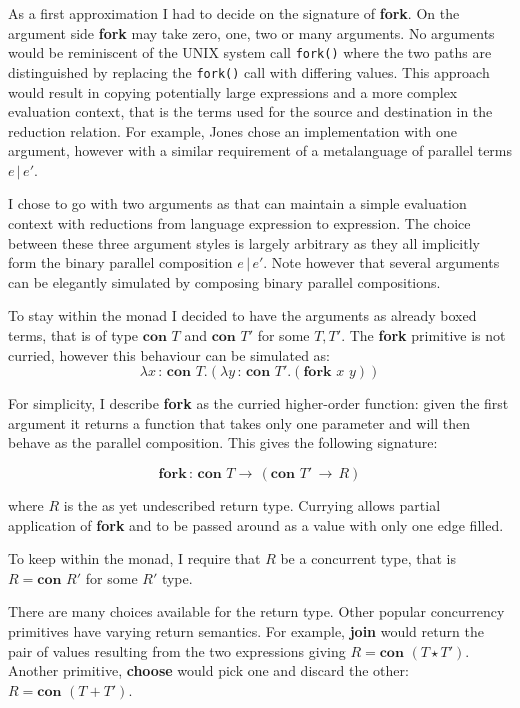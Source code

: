 \documentclass[12pt,twoside,notitlepage]{report}
\theoremstyle{plain}%
\theoremstyle{definition}
\theoremstyle{remark}
\begin{document}
As a first approximation I had to decide on the signature of \textbf{fork}. On the argument side \textbf{fork} may take zero, one, two or many arguments. No arguments would be reminiscent of the UNIX system call \verb|fork()| where the two paths are distinguished by replacing the \verb|fork()| call with differing values. This approach would result in copying potentially large expressions and a more complex evaluation context, that is the terms used for the source and destination in the reduction relation. For example, Jones\cite{hoareetal2001tackling} chose an implementation with one argument, however with a similar requirement of a metalanguage of parallel terms $ e \, | \, e' $. 


I chose to go with two arguments as that can maintain a simple evaluation context with reductions from language expression to expression. The choice between these three argument styles is largely arbitrary as they all implicitly form the binary parallel composition $ e \, | \, e' $. Note however that several arguments can be elegantly simulated by composing binary parallel compositions.

To stay within the monad I decided to have the arguments as already boxed terms, that is of type $ \textbf{con } T $ and $ \textbf{con } T' $ for some $ T, T' $. The \textbf{fork} primitive is not curried, however this behaviour can be simulated as:
\[ \lambda x \,:\,\textbf{con }T.(\lambda y \,:\,\textbf{con }T'.(\textbf{fork}\,\,x\,\,y)) \]

For simplicity, I describe \textbf{fork} as the curried higher-order function: given the first argument it returns a function that takes only one parameter and will then behave as the parallel composition. This gives the following signature:

\[ \textbf{fork} \, : \, \textbf{con } T \rightarrow \, (\textbf{con } T'\, \rightarrow\, R ) \tag{T-Fork1} \]  

where $ R $ is the as yet undescribed return type. Currying allows partial application of \textbf{fork} and to be passed around as a value with only one edge filled. 

To keep within the monad, I require that $ R $ be a concurrent type, that is $ R =  \textbf{con } R' $ for some $ R' $ type. 

There are many choices available for the return type. Other popular concurrency primitives have varying return semantics. For example, \textbf{join} would return the pair of values resulting from the two expressions giving $ R = \textbf{con }(T \star T') $. Another primitive, \textbf{choose} would pick one and discard the other: $ R = \textbf{con }(T + T') $. 
\end{document}
